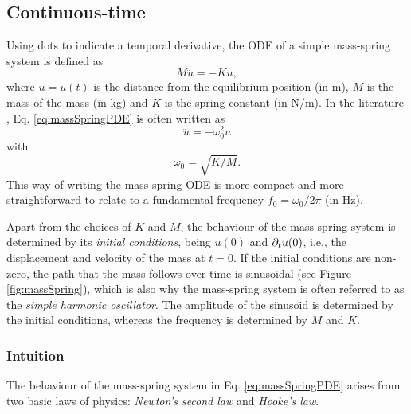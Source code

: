 \subsection{Continuous-time}\label{sec:massSpringCont}
Using dots to indicate a temporal derivative, the ODE of a simple mass-spring system is defined as
\begin{equation}\label{eq:massSpringPDE}
    M\ddot u = -Ku,
\end{equation}
where $u = u(t)$ is the distance from the equilibrium position (in m), $M$ \SWcomment[$>0$] is the mass of the mass (in kg) and $K$ \SWcomment[$\geq 0$] is the spring constant (in N/m). In the literature \cite{theBible, }, Eq. \eqref{eq:massSpringPDE} is often written as
\begin{equation}
    \ddot u = -\omega_0^2u
\end{equation}
with 
\begin{equation}\label{eq:omega0MassSpring}
    \omega_0 = \sqrt{K/M}.
\end{equation}
This way of writing the mass-spring ODE is more compact and more straightforward to relate to a fundamental frequency $f_0 = \omega_0 / 2 \pi$ (in Hz). 

Apart from the choices of $K$ and $M$, the behaviour of the mass-spring system is determined by its \textit{initial conditions}, being $u(0)$ and $\partial_t u(0)$, i.e., the displacement and velocity of the mass at $t = 0$. If the initial conditions are non-zero, the path that the mass follows over time is sinusoidal (see Figure \ref{fig:massSpring}), which is also why the mass-spring system is often referred to as the \textit{simple harmonic oscillator}. The amplitude of the sinusoid is determined by the initial conditions, whereas the frequency is determined by $M$ and $K$. 



\subsubsection{Intuition}
The behaviour of the mass-spring system in Eq. \eqref{eq:massSpringPDE} arises from two basic laws of physics: \textit{Newton's second law} and \textit{Hooke's law}. 

